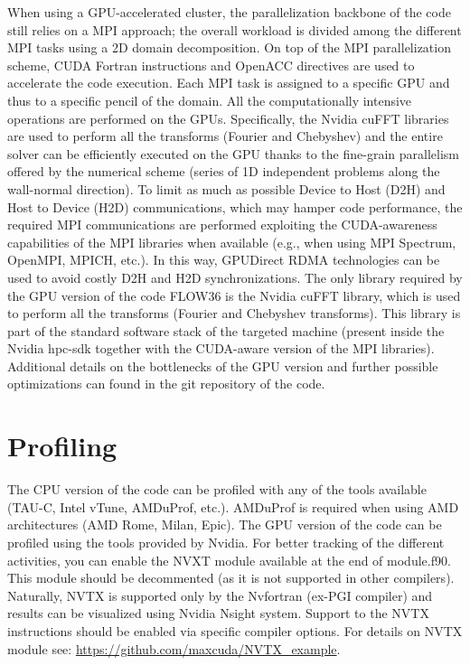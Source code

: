 When using a GPU-accelerated cluster, the parallelization backbone of the code still relies on a MPI approach; the overall workload is divided among the different MPI tasks using a 2D domain decomposition. 
On top of the MPI parallelization scheme, CUDA Fortran instructions and OpenACC directives are used to accelerate the code execution. 
Each MPI task is assigned to a specific GPU and thus to a specific pencil of the domain. 
All the computationally intensive operations are performed on the GPUs. 
Specifically, the Nvidia cuFFT libraries are used to perform all the transforms (Fourier and Chebyshev) and the entire solver can be efficiently executed on the GPU thanks to the fine-grain parallelism offered by the numerical scheme (series of 1D independent problems along the wall-normal direction). 
To limit as much as possible Device to Host (D2H) and Host to Device (H2D) communications, which may hamper code performance, the required MPI communications are performed exploiting the CUDA-awareness capabilities of the MPI libraries when available (e.g., when using MPI Spectrum, OpenMPI, MPICH, etc.). 
In this way, GPUDirect RDMA technologies can be used to avoid costly D2H and H2D synchronizations.
The only library required by the GPU version of the code FLOW36 is the Nvidia cuFFT library, which is used to perform all the transforms (Fourier and Chebyshev transforms). 
This library is part of the standard software stack of the targeted machine (present inside the Nvidia hpc-sdk together with the CUDA-aware version of the MPI libraries).
Additional details on the bottlenecks of the GPU version and further possible optimizations can found in the git repository of the code.

\section{Profiling}
\label{sec: profiling}

The CPU version of the code can be profiled with any of the tools available (TAU-C, Intel vTune, AMDuProf, etc.).
AMDuProf is required when using AMD architectures (AMD Rome, Milan, Epic).
The GPU version of the code can be profiled using the tools provided by Nvidia.
For better tracking of the different activities, you can enable the NVXT module available at the end of module.f90.
This module should be decommented (as it is not supported in other compilers).
Naturally, NVTX is supported only by the Nvfortran (ex-PGI compiler) and results can be visualized using Nvidia Nsight system.
Support to the NVTX instructions should be enabled via specific compiler options.
For details on NVTX module see: \url{https://github.com/maxcuda/NVTX_example}.



